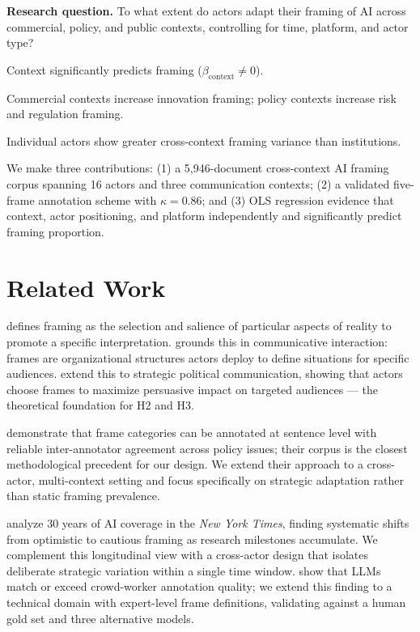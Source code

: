 \documentclass[11pt,a4paper,twocolumn]{article}
\begin{document}
\textbf{Research question.} To what extent do actors adapt their framing of AI
across commercial, policy, and public contexts, controlling for time, platform,
and actor type?

\begin{description}[leftmargin=1.5em, itemsep=1pt, topsep=2pt]
  \item[H1] Context significantly predicts framing ($\beta_{\text{context}} \neq 0$).
  \item[H2] Commercial contexts increase innovation framing; policy contexts
            increase risk and regulation framing.
  \item[H3] Individual actors show greater cross-context framing variance than
            institutions.
\end{description}

We make three contributions: (1) a 5,946-document cross-context AI framing
corpus spanning 16 actors and three communication contexts; (2) a validated
five-frame annotation scheme with $\kappa = 0.86$; and (3) OLS regression
evidence that context, actor positioning, and platform independently and
significantly predict framing proportion.


\section{Related Work}

\citet{entman1993framing} defines framing as the selection and salience of
particular aspects of reality to promote a specific interpretation.
\citet{goffman1974frame} grounds this in communicative interaction: frames are
organizational structures actors deploy to define situations for specific
audiences. \citet{chong2007framing} extend this to strategic political
communication, showing that actors choose frames to maximize persuasive impact
on targeted audiences — the theoretical foundation for H2 and H3.

\citet{card2015media} demonstrate that frame categories can be annotated at
sentence level with reliable inter-annotator agreement across policy issues;
their corpus is the closest methodological precedent for our design. We extend
their approach to a cross-actor, multi-context setting and focus specifically
on strategic adaptation rather than static framing prevalence.

\citet{fast2017long} analyze 30 years of AI coverage in the \textit{New York
Times}, finding systematic shifts from optimistic to cautious framing as
research milestones accumulate. We complement this longitudinal view with a
cross-actor design that isolates deliberate strategic variation within a single
time window. \citet{gilardi2023chatgpt} show that LLMs match or exceed
crowd-worker annotation quality; we extend this finding to a technical domain
with expert-level frame definitions, validating against a human gold set and
three alternative models.
\end{document}
